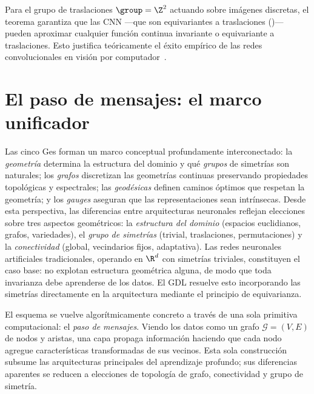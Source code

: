 \begin{example}
\label{ex:priors:cnn-universal}
Para el grupo de traslaciones $\group = \Z^2$ actuando sobre im\'agenes discretas,
el teorema garantiza que las CNN ---que son equivariantes a traslaciones
()--- pueden aproximar cualquier funci\'on continua invariante o
equivariante a traslaciones. Esto justifica te\'oricamente el \'exito emp\'irico
de las redes convolucionales en visi\'on por computador~\citep{cohen2016group}.
\end{example}

\section{El paso de mensajes: el marco unificador}
\label{sec:priors:message-passing}

Las cinco Ges forman un marco conceptual profundamente interconectado: la
\emph{geometr\'ia} determina la estructura del dominio y qu\'e \emph{grupos} de
simetr\'ias son naturales; los \emph{grafos} discretizan las geometr\'ias
continuas preservando propiedades topol\'ogicas y espectrales; las
\emph{geod\'esicas} definen caminos \'optimos que respetan la geometr\'ia; y los
\emph{gauges} aseguran que las representaciones sean intr\'insecas. Desde esta
perspectiva, las diferencias entre arquitecturas neuronales reflejan elecciones
sobre tres aspectos geom\'etricos: la \emph{estructura del dominio} (espacios
euclidianos, grafos, variedades), el \emph{grupo de simetr\'ias} (trivial,
traslaciones, permutaciones) y la \emph{conectividad} (global, vecindarios fijos,
adaptativa). Las redes neuronales artificiales tradicionales, operando en $\R^d$
con simetr\'ias triviales, constituyen el caso base: no explotan estructura
geom\'etrica alguna, de modo que toda invarianza debe aprenderse de los datos. El
GDL resuelve esto incorporando las simetr\'ias directamente en la arquitectura
mediante el principio de equivarianza.

El esquema se vuelve algor\'itmicamente concreto a trav\'es de una sola primitiva
computacional: el \emph{paso de mensajes}. Viendo los datos como un grafo
$\mathcal{G} = (V, E)$ de nodos y aristas, una capa propaga informaci\'on haciendo
que cada nodo agregue caracter\'isticas transformadas de sus vecinos. Esta sola
construcci\'on subsume las arquitecturas principales del aprendizaje profundo; sus
diferencias aparentes se reducen a elecciones de topolog\'ia de grafo,
conectividad y grupo de simetr\'ia.

